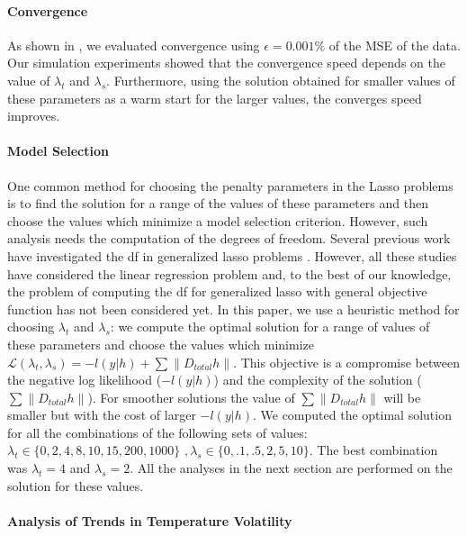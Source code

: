 \documentclass[letterpaper]{article} %
\newcommand{\autoref}{\Cref}
\begin{document}
\paragraph{Convergence}

As shown in \autoref{alg:linADMM}, we evaluated convergence using
$\epsilon=0.001\%$ of the MSE of the data.
Our simulation experiments showed that the
convergence speed depends on the value of $\lambda_t$ and
$\lambda_s$. Furthermore, using the solution obtained for smaller values
of these parameters as a warm start for the larger values, the
converges speed improves.   


\paragraph{Model Selection}
One common method for choosing the penalty parameters in the Lasso
problems is to find the solution for a range of the values of these
parameters and then choose the values which minimize a model selection
criterion. However, such analysis needs the computation of the degrees
of freedom. Several previous work have investigated the df in
generalized lasso problems
\cite{tibshirani_degrees_2012,hu_dual_2015,zeng_geometry_2017}. However,
all these studies have considered the linear regression problem and,
to the best of our knowledge, the problem of computing the df for
generalized lasso with general objective function has not been
considered yet. In this paper, we use a heuristic method for choosing $\lambda_t$ and
$\lambda_s$: we compute the optimal solution for a range of values of
these parameters and choose the values which minimize
$\mathscr{L}(\lambda_t,\lambda_s)=-l(y|h)+ \sum \lVert D_{total}h
\lVert$. This objective is a compromise between the negative log
likelihood ($-l(y|h)$) and the complexity of the solution ($\sum
\lVert D_{total}h \lVert$). For smoother solutions the value of $\sum
\lVert D_{total}h \lVert$ will be smaller but with the cost of larger
$-l(y|h)$. We computed the optimal solution for all the combinations of the
following sets of values: $\lambda_t \in \{0,2,4,8,10,15,200,1000\} \, \, ,
\lambda_s \in \{0,.1,.5,2,5,10\}$. The best combination was
$\lambda_t=4$ and $\lambda_s=2$. All the analyses in the next section
are performed on the solution for these values.  


\paragraph{Analysis of Trends in Temperature Volatility}
\end{document}

